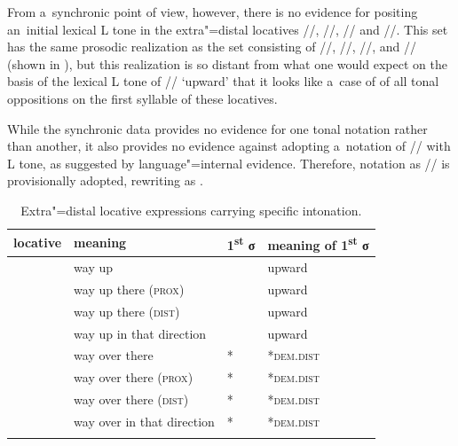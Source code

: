 From a~synchronic point of view, however, there is no evidence for positing an~initial lexical L tone in the extra"=distal locatives //,
//, // and //. This set has the same prosodic realization as the set consisting of //, //, //, and // (shown in ), but this realization is
so distant from what one would expect on the basis of the lexical L tone of // ‘upward’
that it looks like a~case of  of all tonal oppositions on the first syllable of these
locatives.  

While the synchronic data provides no evidence for one tonal notation rather than another, it also provides no evidence against adopting a~notation of // with L tone, as suggested by language"=internal evidence. Therefore, notation as // is provisionally adopted, rewriting  as . 

\begin{table}%
	\caption{Extra"=distal locative expressions carrying specific {intonation}.}
	\begin{tabularx}{\textwidth}{ l Q l@{\hspace{10mm}} l }
		\lsptoprule
		locative & meaning & 1\textsuperscript{st} σ & meaning of 1\textsuperscript{st} σ\\\midrule
		 & way up &  & upward\\
		 & way up there (\textsc{prox}) &  & upward\\
		 & way up there (\textsc{dist}) &  & upward\\
		 & way up in that direction &  & upward\\ \addlinespace \hdashline \addlinespace
		 & way over there & * & *\textsc{dem.dist}\\
		 & way over there (\textsc{prox}) & * & *\textsc{dem.dist}\\
		 & way over there (\textsc{dist}) & * & *\textsc{dem.dist}\\
		 & way over in that direction & * & *\textsc{dem.dist}\\
		\lspbottomrule
	\end{tabularx}
	\label{tab:expressivelocativesUNDER}
\end{table}

